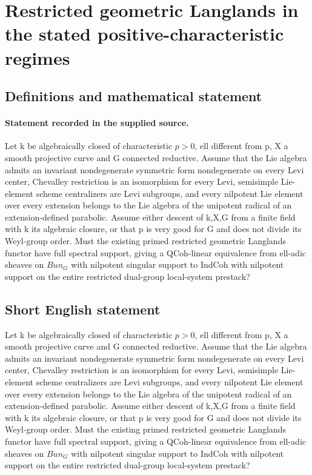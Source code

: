 \documentclass[11pt]{article}
\begin{document}
\section*{Restricted geometric Langlands in the stated positive-characteristic regimes}\label{statement}
\subsection{Definitions and mathematical statement}
\paragraph{Statement recorded in the supplied source.}
Let k be algebraically closed of characteristic $p>0$, ell different from p, X a smooth projective curve and G connected reductive. Assume that the Lie algebra admits an invariant nondegenerate symmetric form nondegenerate on every Levi center, Chevalley restriction is an isomorphism for every Levi, semisimple Lie-element scheme centralizers are Levi subgroups, and every nilpotent Lie element over every extension belongs to the Lie algebra of the unipotent radical of an extension-defined parabolic. Assume either descent of k,X,G from a finite field with k its algebraic closure, or that p is very good for G and does not divide its Weyl-group order. Must the existing primed restricted geometric Langlands functor have full spectral support, giving a QCoh-linear equivalence from ell-adic sheaves on $Bun_G$ with nilpotent singular support to IndCoh with nilpotent support on the entire restricted dual-group local-system prestack?
\subsection{Short English statement}
Let k be algebraically closed of characteristic $p>0$, ell different from p, X a smooth projective curve and G connected reductive. Assume that the Lie algebra admits an invariant nondegenerate symmetric form nondegenerate on every Levi center, Chevalley restriction is an isomorphism for every Levi, semisimple Lie-element scheme centralizers are Levi subgroups, and every nilpotent Lie element over every extension belongs to the Lie algebra of the unipotent radical of an extension-defined parabolic. Assume either descent of k,X,G from a finite field with k its algebraic closure, or that p is very good for G and does not divide its Weyl-group order. Must the existing primed restricted geometric Langlands functor have full spectral support, giving a QCoh-linear equivalence from ell-adic sheaves on $Bun_G$ with nilpotent singular support to IndCoh with nilpotent support on the entire restricted dual-group local-system prestack?
\end{document}
